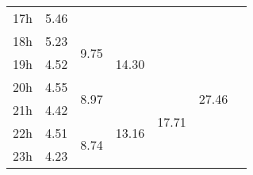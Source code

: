 \begin{center}
\begin{tabular}{| l || c | c | c | c | c | c |}
17h & \multirow{1}{*}{ 5.46 }  & & & & & \\\cline{2-2}\cline{3-3}\cline{4-4}\cline{6-6}
18h & \multirow{1}{*}{ 5.23 }  & \multirow{2}{*}{ 9.75 }  & \multirow{3}{*}{ 14.30 }  & & \multirow{6}{*}{ 27.46 }  & \\\cline{2-2}
19h & \multirow{1}{*}{ 4.52 }  & & & & & \\\cline{2-2}\cline{3-3}\cline{5-5}
20h & \multirow{1}{*}{ 4.55 }  & \multirow{2}{*}{ 8.97 }  & & \multirow{4}{*}{ 17.71 }  & & \\\cline{2-2}\cline{4-4}
21h & \multirow{1}{*}{ 4.42 }  & & \multirow{3}{*}{ 13.16 }  & & & \\\cline{2-2}\cline{3-3}
22h & \multirow{1}{*}{ 4.51 }  & \multirow{2}{*}{ 8.74 }  & & & & \\\cline{2-2}
23h & \multirow{1}{*}{ 4.23 }  & & & & & \\\cline{2-2}\cline{3-3}\cline{4-4}\cline{5-5}\cline{6-6}\cline{7-7}
\hline\end{tabular}
\end{center}